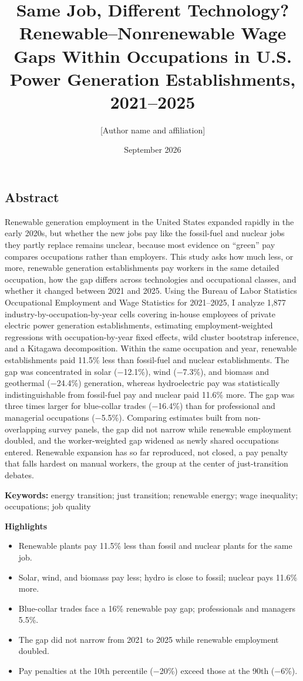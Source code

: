 \documentclass[
  11pt,
]{article}
\title{Same Job, Different Technology? Renewable--Nonrenewable Wage Gaps
Within Occupations in U.S. Power Generation Establishments, 2021--2025}
\author{{[}Author name and affiliation{]}}
\date{September 2026}
\providecommand{\tightlist}{%
  \setlength{\itemsep}{0pt}\setlength{\parskip}{0pt}}
\begin{document}
\maketitle

\subsection{Abstract}\label{abstract}

Renewable generation employment in the United States expanded rapidly in
the early 2020s, but whether the new jobs pay like the fossil-fuel and
nuclear jobs they partly replace remains unclear, because most evidence
on ``green'' pay compares occupations rather than employers. This study
asks how much less, or more, renewable generation establishments pay
workers in the same detailed occupation, how the gap differs across
technologies and occupational classes, and whether it changed between
2021 and 2025. Using the Bureau of Labor Statistics Occupational
Employment and Wage Statistics for 2021--2025, I analyze 1,877
industry-by-occupation-by-year cells covering in-house employees of
private electric power generation establishments, estimating
employment-weighted regressions with occupation-by-year fixed effects,
wild cluster bootstrap inference, and a Kitagawa decomposition. Within
the same occupation and year, renewable establishments paid 11.5\% less
than fossil-fuel and nuclear establishments. The gap was concentrated in
solar (−12.1\%), wind (−7.3\%), and biomass and geothermal (−24.4\%)
generation, whereas hydroelectric pay was statistically
indistinguishable from fossil-fuel pay and nuclear paid 11.6\% more. The
gap was three times larger for blue-collar trades (−16.4\%) than for
professional and managerial occupations (−5.5\%). Comparing estimates
built from non-overlapping survey panels, the gap did not narrow while
renewable employment doubled, and the worker-weighted gap widened as
newly shared occupations entered. Renewable expansion has so far
reproduced, not closed, a pay penalty that falls hardest on manual
workers, the group at the center of just-transition debates.

\textbf{Keywords:} energy transition; just transition; renewable energy;
wage inequality; occupations; job quality

\textbf{Highlights}

\begin{itemize}
\tightlist
\item
  Renewable plants pay 11.5\% less than fossil and nuclear plants for
  the same job.
\item
  Solar, wind, and biomass pay less; hydro is close to fossil; nuclear
  pays 11.6\% more.
\item
  Blue-collar trades face a 16\% renewable pay gap; professionals and
  managers 5.5\%.
\item
  The gap did not narrow from 2021 to 2025 while renewable employment
  doubled.
\item
  Pay penalties at the 10th percentile (−20\%) exceed those at the 90th
  (−6\%).
\end{itemize}
\end{document}
